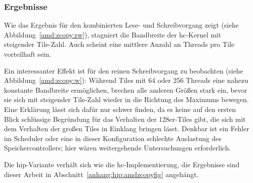 \subsubsection{Ergebnisse}

Wie das Ergebnis für den kombinierten Lese- und Schreibvorgang zeigt (siehe
Abbildung~\ref{amd:zcopy:rw}), stagniert die Bandbreite der \gls{hc}-Kernel mit
steigender Tile-Zahl. Auch scheint eine mittlere Anzahl an Threads pro Tile
vorteilhaft sein.

Ein interessanter Effekt ist für den reinen Schreibvorgang zu beobachten (siehe
Abbildung~\ref{amd:zcopy:w}): Während Tiles mit \num{64} oder \num{256} Threads
eine nahezu konstante Bandbreite ermöglichen, brechen alle anderen Größen stark
ein, bevor sie sich mit steigender Tile-Zahl wieder in die Richtung des Maximums
bewegen. Eine Erklärung lässt sich dafür nur schwer finden, da es keine auf den
ersten Blick schlüssige Begründung für das Verhalten der \num{128}er-Tiles gibt,
die sich mit dem Verhalten der großen Tiles in Einklang bringen lässt. Denkbar
ist ein Fehler im Scheduler oder eine in dieser Konfiguration schlechte
Auslastung des Speichercontrollers; hier wären weitergehende Untersuchungen
erforderlich.

Die \gls{hip}-Variante verhält sich wie die \gls{hc}-Implementierung, die
Ergebnisse sind dieser Arbeit in Abschnitt~\ref{anhang:hip:amdzcopyfig}
angehängt.

